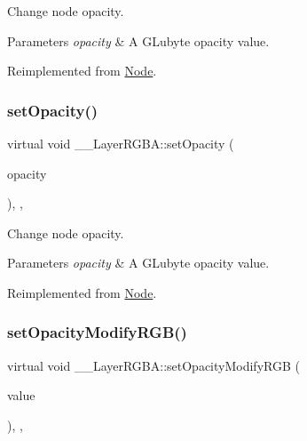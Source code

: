 Change node opacity. 
\begin{DoxyParams}{Parameters}
{\em opacity} & A G\+Lubyte opacity value. \\
\hline
\end{DoxyParams}


Reimplemented from \hyperlink{classNode_ae41a9db63bfa3d466ee7c9d79c35352d}{Node}.

\mbox{\label{class____LayerRGBA_a1b172623ee7486835fd189672d19d8d7}} 
\subsubsection{\texorpdfstring{set\+Opacity()}{setOpacity()}\hspace{0.1cm}{\footnotesize\ttfamily [2/2]}}
{\footnotesize\ttfamily virtual void \+\_\+\+\_\+\+Layer\+R\+G\+B\+A\+::set\+Opacity (\begin{DoxyParamCaption}\item[{G\+Lubyte}]{opacity }\end{DoxyParamCaption})\hspace{0.3cm}{\ttfamily [inline]}, {\ttfamily [override]}, {\ttfamily [virtual]}}

Change node opacity. 
\begin{DoxyParams}{Parameters}
{\em opacity} & A G\+Lubyte opacity value. \\
\hline
\end{DoxyParams}


Reimplemented from \hyperlink{classNode_ae41a9db63bfa3d466ee7c9d79c35352d}{Node}.

\mbox{\label{class____LayerRGBA_a04037a60b1a1f9d5ba2760252ad2da35}} 
\subsubsection{\texorpdfstring{set\+Opacity\+Modify\+R\+G\+B()}{setOpacityModifyRGB()}\hspace{0.1cm}{\footnotesize\ttfamily [1/2]}}
{\footnotesize\ttfamily virtual void \+\_\+\+\_\+\+Layer\+R\+G\+B\+A\+::set\+Opacity\+Modify\+R\+GB (\begin{DoxyParamCaption}\item[{bool}]{value }\end{DoxyParamCaption})\hspace{0.3cm}{\ttfamily [inline]}, {\ttfamily [override]}, {\ttfamily [virtual]}}

